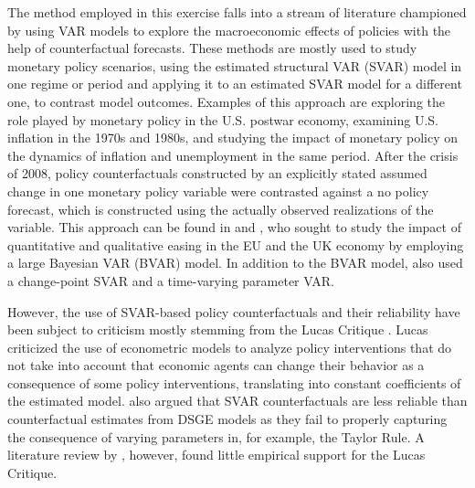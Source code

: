 \begin{CJK*}{UTF8}{min}


The method employed in this exercise falls into a stream of literature championed by \citet{csims1980} using VAR models to explore the macroeconomic effects of policies with the help of counterfactual forecasts. These methods are mostly  used to study monetary policy scenarios, using the estimated structural VAR (SVAR) model in one regime or period and applying it to an estimated SVAR model for a different one, to contrast model outcomes. Examples of this approach are \citet{csims1998} exploring the role played by monetary policy in the U.S. postwar economy, \citet{csims2006}  examining U.S. inflation in the 1970s and 1980s, and \citet{primi2005} studying the impact of monetary policy on the dynamics of inflation and unemployment in the same period. After the crisis of 2008, policy counterfactuals constructed by an explicitly stated assumed change in one monetary policy variable were contrasted against a no policy forecast, which is constructed using the actually observed realizations of the variable. This approach can be found in \citet{lenza2010} and \citet{kapetanios2012}, who sought to study the impact of quantitative and qualitative easing in the EU and the UK economy by employing a large Bayesian VAR (BVAR) model. In addition to the BVAR model, \citeauthor{kapetanios2012} also used a change-point SVAR and a time-varying parameter VAR.

However, the use of SVAR-based policy counterfactuals and their reliability have been subject to criticism mostly stemming from the Lucas Critique \citep{lucas1976}. Lucas criticized the use of econometric models to analyze policy interventions that do not take into account that economic agents can change their behavior as a consequence of some policy interventions, translating into constant coefficients of the estimated model. \citet{benati2010} also argued that SVAR counterfactuals are less reliable than counterfactual estimates from DSGE models as they fail to properly capturing the consequence of varying parameters in, for example, the Taylor Rule. A literature review by \citet{ericsson1995}, however, found little empirical support for the Lucas Critique.


\end{CJK*}
